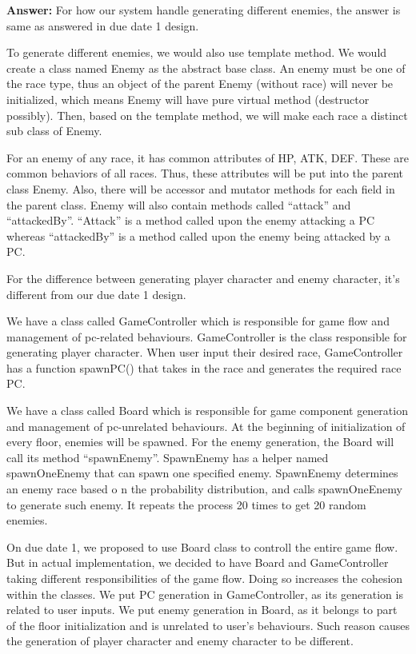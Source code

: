 \documentclass[11pt]{article}
\theoremstyle{plain} \newtheorem{theorem*}{Theorem}[subsection]
\begin{document}
\textbf{Answer:}
For how our system handle generating different enemies, the answer is same as
answered in due date 1 design. 

To generate different enemies, we would also use template method. We would
create a class named Enemy as the abstract base class. An enemy must be one of
the race type, thus an object of the parent Enemy (without race) will never be
initialized, which means Enemy will have pure virtual method (destructor
possibly). Then, based on the template method, we will make each race a
distinct sub class of Enemy.  

For an enemy of any race, it has common attributes of HP, ATK, DEF. These are
common behaviors of all races. Thus, these attributes will be put into the
parent class Enemy. Also, there will be accessor and mutator methods for each
field in the parent class. Enemy will also contain methods called “attack” and
“attackedBy”. “Attack” is a method called upon the enemy attacking a PC whereas
“attackedBy” is a method called upon the enemy being attacked by a PC. 

For the difference between generating player character and enemy character,
it’s different from our due date 1 design. 


We have a class called GameController which is responsible for game flow and
management of pc-related behaviours. GameController is the class responsible
for generating player character. When user input their desired race,
GameController has a function spawnPC() that takes in the race and generates
the required race PC.  

We have a class called Board which is responsible for game component generation
and management of pc-unrelated behaviours.  At the beginning of initialization
of every floor, enemies will be spawned. For the enemy generation, the Board
will call its method “spawnEnemy”. SpawnEnemy has a helper named spawnOneEnemy
that can spawn one specified enemy. SpawnEnemy determines an enemy race based o
n the probability distribution, and calls spawnOneEnemy to generate such enemy.
It repeats the process 20 times to get 20 random enemies. 

On due date 1, we proposed to use Board class to controll the entire game flow.
But in actual implementation, we decided to have Board and GameController
taking different responsibilities of the game flow. Doing so increases the
cohesion within the classes. We put PC generation in GameController, as its
generation is related to user inputs. We put enemy generation in Board, as it
belongs to part of the floor initialization and is unrelated to user’s
behaviours. Such reason causes the generation of player character and enemy
character to be different. \\
\end{document}
